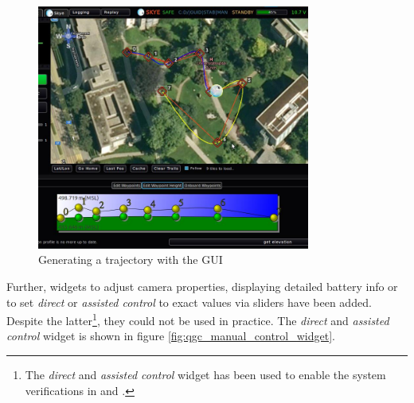 \begin{figure}[H] %
	\begin{center}
		\includegraphics[width=0.8\textwidth]{qgc_automatic_control}
		\caption{Generating a trajectory with the GUI}
		\label{fig:qgc_automatic_control}		
	\end{center}
\end{figure}


Further, widgets to adjust camera properties, displaying detailed battery info or to set \textit{direct} or \textit{assisted control} to exact values via sliders have been added. Despite the latter\footnote{The \textit{direct} and \textit{assisted control} widget has been used to enable the system verifications in \cite{meiermueri} and \cite{weichart}.}, they could not be used in practice. The \textit{direct} and \textit{assisted control} widget is shown in figure \ref{fig:qgc_manual_control_widget}.

